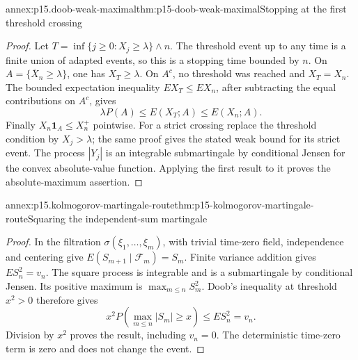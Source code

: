\begin{annexitem}{annex:p15.doob-weak-maximal}{thm:p15-doob-weak-maximal}{Stopping at the first threshold crossing}
\begin{proof}
Let \(T=\inf\{j\geq0:X_j\geq\lambda\}\wedge n\).
The threshold event up to any time is a finite union of adapted
events, so this is a stopping time bounded by \(n\).
On \(A=\{\overline X_n\geq\lambda\}\), one has \(X_T\geq\lambda\).
On \(A^c\), no threshold was reached and \(X_T=X_n\).
The bounded expectation inequality \(EX_T\leq EX_n\), after
subtracting the equal contributions on \(A^c\), gives
\[
                      \lambda P(A)\leq E(X_T;A)\leq E(X_n;A).
\]
Finally \(X_n\mathbf1_A\leq X_n^+\) pointwise.
For a strict crossing replace the threshold condition by
\(X_j>\lambda\); the same proof gives the stated weak bound
for its strict event.
The process \(|Y_j|\) is an integrable submartingale by conditional
Jensen for the convex absolute-value function. Applying the first
result to it proves the absolute-maximum assertion.
\end{proof}
\end{annexitem}

\begin{annexitem}{annex:p15.kolmogorov-martingale-route}{thm:p15-kolmogorov-martingale-route}{Squaring the independent-sum martingale}
\begin{proof}
In the filtration \(\sigma(\xi_1,\ldots,\xi_m)\), with trivial
time-zero field, independence and centering give
\(E(S_{m+1}\mid\mathcal F_m)=S_m\).
Finite variance addition gives \(ES_n^2=v_n\).
The square process is integrable and is a submartingale by
conditional Jensen. Its positive maximum is
\(\max_{m\leq n}S_m^2\). Doob's inequality at threshold \(x^2>0\)
therefore gives
\[
             x^2P(\max_{m\leq n}|S_m|\geq x)\leq ES_n^2=v_n.
\]
Division by \(x^2\) proves the result, including \(v_n=0\).
The deterministic time-zero term is zero and does not change the event.
\end{proof}
\end{annexitem}

